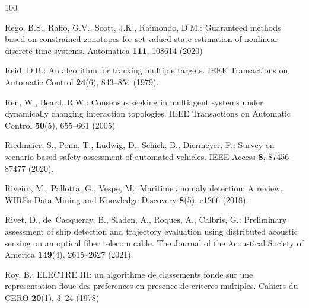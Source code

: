 \documentclass[graybox,envcountchap]{style/SNmono}
\begin{document}
\begin{thebibliography}{100}
{\color{red} 
Rego, B.S., Raffo, G.V., Scott, J.K., Raimondo, D.M.: Guaranteed methods based
  on constrained zonotopes for set-valued state estimation of nonlinear
  discrete-time systems.
\newblock Automatica \textbf{111}, 108614 (2020)

\par}

Reid, D.B.: An algorithm for tracking multiple targets.
\newblock IEEE Transactions on Automatic Control \textbf{24}(6), 843--854
  (1979).
\newblock {}



Ren, W., Beard, R.W.: Consensus seeking in multiagent systems under dynamically
  changing interaction topologies.
\newblock IEEE Transactions on Automatic Control \textbf{50}(5), 655--661
  (2005)



Riedmaier, S., Ponn, T., Ludwig, D., Schick, B., Diermeyer, F.: Survey on
  scenario-based safety assessment of automated vehicles.
\newblock IEEE Access \textbf{8}, 87456--87477 (2020).
\newblock {}



Riveiro, M., Pallotta, G., Vespe, M.: Maritime anomaly detection: A review.
\newblock WIREs Data Mining and Knowledge Discovery \textbf{8}(5), e1266
  (2018).
\newblock {}



Rivet, D., de~Cacqueray, B., Sladen, A., Roques, A., Calbris, G.: Preliminary
  assessment of ship detection and trajectory evaluation using distributed
  acoustic sensing on an optical fiber telecom cable.
\newblock The Journal of the Acoustical Society of America \textbf{149}(4),
  2615--2627 (2021).
\newblock {}


{\color{red} 
Roy, B.: {ELECTRE III}: un algorithme de classements fonde sur une
  representation floue des preferences en presence de criteres multiples.
\newblock Cahiers du CERO \textbf{20}(1), 3--24 (1978)

}
\end{thebibliography}
\end{document}
